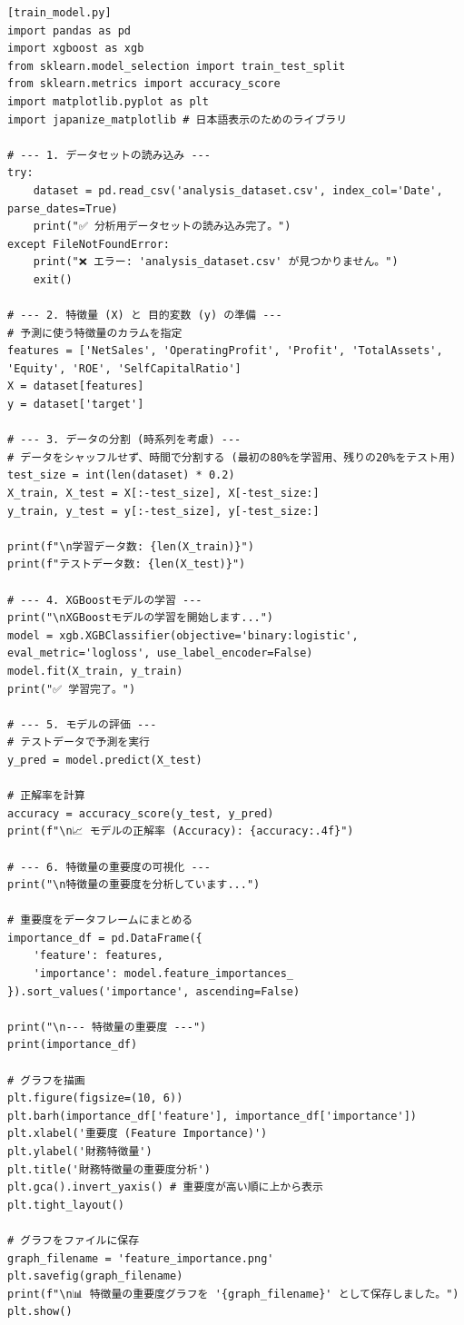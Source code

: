 \documentclass[a4paper, 11pt]{ltjsarticle}
\begin{document}
\begin{verbatim}
[train_model.py] 
import pandas as pd
import xgboost as xgb
from sklearn.model_selection import train_test_split
from sklearn.metrics import accuracy_score
import matplotlib.pyplot as plt
import japanize_matplotlib # 日本語表示のためのライブラリ

# --- 1. データセットの読み込み ---
try:
    dataset = pd.read_csv('analysis_dataset.csv', index_col='Date', parse_dates=True)
    print("✅ 分析用データセットの読み込み完了。")
except FileNotFoundError:
    print("❌ エラー: 'analysis_dataset.csv' が見つかりません。")
    exit()

# --- 2. 特徴量 (X) と 目的変数 (y) の準備 ---
# 予測に使う特徴量のカラムを指定
features = ['NetSales', 'OperatingProfit', 'Profit', 'TotalAssets', 'Equity', 'ROE', 'SelfCapitalRatio']
X = dataset[features]
y = dataset['target']

# --- 3. データの分割 (時系列を考慮) ---
# データをシャッフルせず、時間で分割する (最初の80%を学習用、残りの20%をテスト用)
test_size = int(len(dataset) * 0.2)
X_train, X_test = X[:-test_size], X[-test_size:]
y_train, y_test = y[:-test_size], y[-test_size:]

print(f"\n学習データ数: {len(X_train)}")
print(f"テストデータ数: {len(X_test)}")

# --- 4. XGBoostモデルの学習 ---
print("\nXGBoostモデルの学習を開始します...")
model = xgb.XGBClassifier(objective='binary:logistic', eval_metric='logloss', use_label_encoder=False)
model.fit(X_train, y_train)
print("✅ 学習完了。")

# --- 5. モデルの評価 ---
# テストデータで予測を実行
y_pred = model.predict(X_test)

# 正解率を計算
accuracy = accuracy_score(y_test, y_pred)
print(f"\n📈 モデルの正解率 (Accuracy): {accuracy:.4f}")

# --- 6. 特徴量の重要度の可視化 ---
print("\n特徴量の重要度を分析しています...")

# 重要度をデータフレームにまとめる
importance_df = pd.DataFrame({
    'feature': features,
    'importance': model.feature_importances_
}).sort_values('importance', ascending=False)

print("\n--- 特徴量の重要度 ---")
print(importance_df)

# グラフを描画
plt.figure(figsize=(10, 6))
plt.barh(importance_df['feature'], importance_df['importance'])
plt.xlabel('重要度 (Feature Importance)')
plt.ylabel('財務特徴量')
plt.title('財務特徴量の重要度分析')
plt.gca().invert_yaxis() # 重要度が高い順に上から表示
plt.tight_layout()

# グラフをファイルに保存
graph_filename = 'feature_importance.png'
plt.savefig(graph_filename)
print(f"\n📊 特徴量の重要度グラフを '{graph_filename}' として保存しました。")
plt.show()
\end{verbatim}
\end{document}
